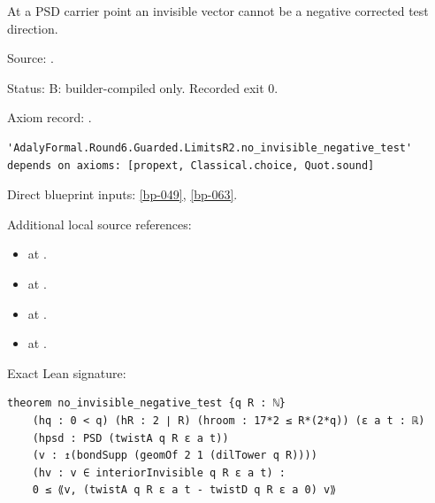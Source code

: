 \begin{theorem}[bp-064]
\label{bp-064}
\leanok
At a PSD carrier point an invisible vector cannot be a negative corrected test direction.

\par Source: \texttt{}.
\par Status: B: builder-compiled only. Recorded exit 0.
\par Axiom record: \texttt{}.
\begin{verbatim}
'AdalyFormal.Round6.Guarded.LimitsR2.no_invisible_negative_test' depends on axioms: [propext, Classical.choice, Quot.sound]
\end{verbatim}
\par Direct blueprint inputs: \ref{bp-049}, \ref{bp-063}.
\par Additional local source references:
\begin{itemize}
\item \texttt{} at \texttt{}.
\item \texttt{} at \texttt{}.
\item \texttt{} at \texttt{}.
\item \texttt{} at \texttt{}.
\end{itemize}
\par Exact Lean signature:
\begin{verbatim}
theorem no_invisible_negative_test {q R : ℕ}
    (hq : 0 < q) (hR : 2 ∣ R) (hroom : 17*2 ≤ R*(2*q)) (ε a t : ℝ)
    (hpsd : PSD (twistA q R ε a t))
    (v : ↥(bondSupp (geomOf 2 1 (dilTower q R))))
    (hv : v ∈ interiorInvisible q R ε a t) :
    0 ≤ ⟪v, (twistA q R ε a t - twistD q R ε a 0) v⟫
\end{verbatim}
\end{theorem}

